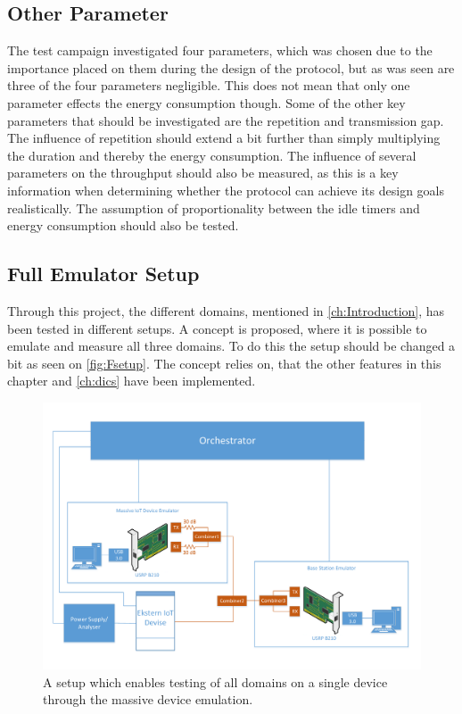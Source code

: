\subsection{Other Parameter}
The test campaign investigated four parameters, which was chosen due to the importance placed on them during the design of the protocol, but as was seen are three of the four parameters negligible. This does not mean that only one parameter effects the energy consumption though. Some of the other key parameters that should be investigated are the repetition and transmission gap. The influence of repetition should extend a bit further than simply multiplying the duration and thereby the energy consumption. The influence of several parameters on the throughput should also be measured, as this is a key information when determining whether the protocol can achieve its design goals realistically. The assumption of proportionality between the idle timers and energy consumption should also be tested.

\subsection{Full Emulator Setup}
Through this project, the different domains, mentioned in \autoref{ch:Introduction}, has been tested in different setups. A concept is proposed, where it is possible to emulate and measure all three domains. To do this the setup should be changed a bit as seen on \autoref{fig:Fsetup}. The concept relies on, that the other features in this chapter and \autoref{ch:dics} have been implemented. 

\begin{figure}[H]
\centering
\includegraphics[width=\textwidth]{figures/General_test_setup.pdf}
\caption{A setup which enables testing of all domains on a single device through the massive device emulation.}
\label{fig:Fsetup}
\end{figure}


